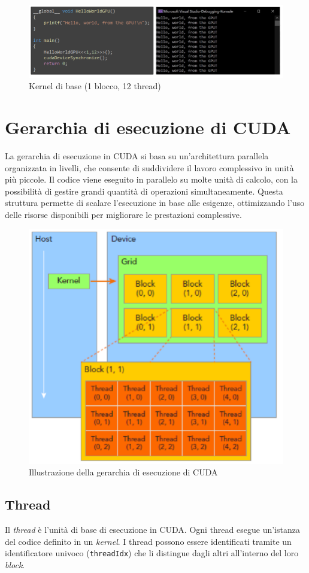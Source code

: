 \documentclass[12pt,a4paper]{report}
\begin{document}
\begin{figure}[h]
    \includegraphics[width=1\linewidth]{img/basic_kernel.png}
    \caption{Kernel di base (1 blocco, 12 thread) \cite{CUDAtutorial}}
\end{figure}

\section{Gerarchia di esecuzione di CUDA}

La gerarchia di esecuzione in CUDA si basa su un'architettura parallela organizzata in livelli, che consente di suddividere il lavoro complessivo in unità più piccole. Il codice viene eseguito in parallelo su molte unità di calcolo, con la possibilità di gestire grandi quantità di operazioni simultaneamente. Questa struttura permette di scalare l'esecuzione in base alle esigenze, ottimizzando l'uso delle risorse disponibili per migliorare le prestazioni complessive.

\begin{figure}[h]
    \centering
    \includegraphics[width=0.7\linewidth]{img/hierarchy.png}
    \caption{Illustrazione della gerarchia di esecuzione di CUDA \cite{CUDAhierarchy}}
\end{figure}

\subsection*{Thread}
Il \textit{thread} è l'unità di base di esecuzione in CUDA. Ogni thread esegue un'istanza del codice definito in un \textit{kernel}. I thread possono essere identificati tramite un identificatore univoco (\texttt{threadIdx}) che li distingue dagli altri all'interno del loro \textit{block}.
\end{document}
